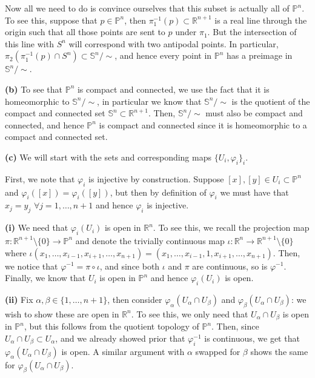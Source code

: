 \documentclass[10pt]{article}
\newcommand{\R}{\mathbb{R}}
\newcommand{\Sp}{\mathbb{S}}
\newcommand{\Pro}{\mathbb{P}}
\begin{document}
Now all we need to do is convince ourselves that this subset is actually all of $\Pro^{n}$. To see this, suppose that $p\in \Pro^{n}$, then $\pi_{1}^{-1}(p) \subset \R^{n+1}$ is a real line through the origin such that all those points are sent to $p$ under $\pi_{1}$. But the intersection of this line with $S^{n}$ will correspond with two antipodal points. In particular, $\pi_{2}\left(\pi_{1}^{-1}(p)\cap S^{n}\right)\subset \Sp^{n}/\sim$, and hence every point in $\Pro^{n}$ has a preimage in $\Sp^{n}/\sim$.

\textbf{(b)} To see that $\Pro^{n}$ is compact and connected, we use the fact that it is homeomorphic to $\Sp^{n}/\sim$, in particular we know that $\Sp^{n}/\sim$ is the quotient of the compact and connected set $\Sp^{n}\subset \R^{n+1}$. Then, $\Sp^{n}/\sim$ must also be compact and connected, and hence $\Pro^{n}$ is compact and connected since it is homeomorphic to a compact and connected set.

\textbf{(c)} We will start with the sets and corresponding maps $\{U_{i}, \varphi_{i}\}_{i}$.

First, we note that $\varphi_{i}$ is injective by construction. Suppose $[x],[y]\in U_{i}\subset\Pro^{n}$ and $\varphi_{i}([x]) = \varphi_{i}([y])$, but then by definition of $\varphi_{i}$ we must have that $x_{j} = y_{j}$ $\forall j= 1,\dots,n+1$ and hence $\varphi_{i}$ is injective.

\textbf{(i)}
We need that $\varphi_{i}(U_{i})$ is open in $\R^{n}$. To see this, we recall the projection map $\pi: \R^{n+1}\setminus\{0\} \to \Pro^{n}$ and denote the trivially continuous map $\iota: \R^{n} \to \R^{n+1}\setminus\{0\}$ where $\iota(x_{1},\dots,x_{i-1},x_{i+1},\dots,x_{n+1}) = (x_{1},\dots,x_{i-1},1,x_{i+1},\dots,x_{n+1})$. Then, we notice that $\varphi^{-1} = \pi \circ \iota$, and since both $\iota$ and $\pi$ are continuous, so is $\varphi^{-1}$. Finally, we know that $U_{i}$ is open in $\Pro^{n}$ and hence $\varphi_{i}(U_{i})$ is open.

\textbf{(ii)}
Fix $\alpha,\beta\in\{1,\dots,n+1\}$, then consider $\varphi_{\alpha}(U_{\alpha}\cap U_{\beta})$ and $\varphi_{\beta}(U_{\alpha}\cap U_{\beta})$: we wish to show these are open in $\R^{n}$. To see this, we only need that $U_{\alpha}\cap U_{\beta}$ is open in $\Pro^{n}$, but this follows from the quotient topology of $\Pro^{n}$. Then, since $U_{\alpha}\cap U_{\beta} \subset U_{\alpha}$, and we already showed prior that $\varphi_{i}^{-1}$ is continuous, we get that $\varphi_{\alpha}(U_{\alpha}\cap U_{\beta})$ is open. A similar argument with $\alpha$ swapped for $\beta$ shows the same for $\varphi_{\beta}(U_{\alpha}\cap U_{\beta})$.
\end{document}
